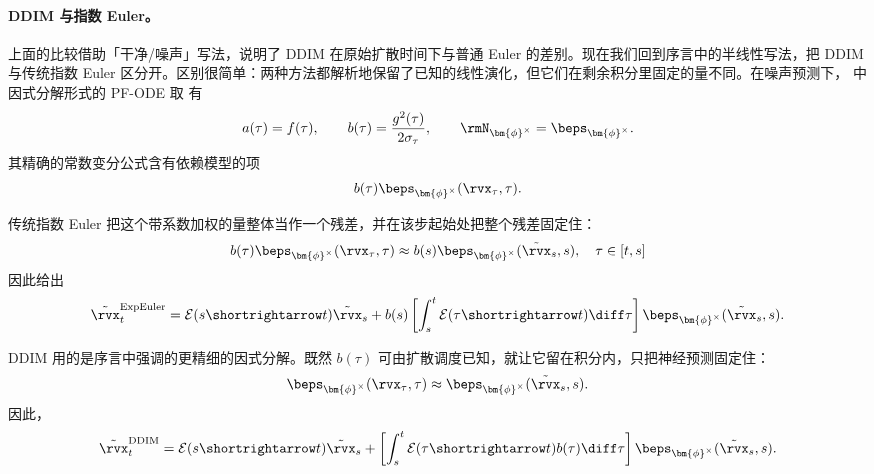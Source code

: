 \paragraph{DDIM 与指数 Euler。}
上面的比较借助「干净/噪声」写法，说明了 DDIM 在原始扩散时间下与普通 Euler 的差别。现在我们回到序言中的半线性写法，把 DDIM 与传统指数 Euler 区分开。区别很简单：两种方法都解析地保留了已知的线性演化，但它们在剩余积分里固定的量不同。在噪声预测下， 中因式分解形式的 PF-ODE 取
 有
\[
a(\tau)=f(\tau),
\qquad
b(\tau)=\frac{g^2(\tau)}{2\sigma_\tau},
\qquad
\rmN_{\bm{\phi}^\times}
=
\beps_{\bm{\phi}^\times}.
\]
其精确的常数变分公式含有依赖模型的项
\[
b(\tau)\beps_{\bm{\phi}^\times}(\rvx_\tau,\tau).
\]

传统指数 Euler 把这个带系数加权的量整体当作一个残差，并在该步起始处把整个残差固定住：
\[
b(\tau)\beps_{\bm{\phi}^\times}(\rvx_\tau,\tau)
\approx
b(s)\beps_{\bm{\phi}^\times}(\tilde\rvx_s,s), \quad\tau\in[t,s]
\]
因此给出
\[
\tilde\rvx_t^{\mathrm{ExpEuler}}
=
\mathcal E(s\shortrightarrow t)\tilde\rvx_s
+
b(s)
\left[
\int_s^t
\mathcal E(\tau\shortrightarrow t)
\diff\tau
\right]
\beps_{\bm{\phi}^\times}(\tilde\rvx_s,s).
\]

DDIM 用的是序言中强调的更精细的因式分解。既然 $b(\tau)$ 可由扩散调度已知，就让它留在积分内，只把神经预测固定住：
\[
\beps_{\bm{\phi}^\times}(\rvx_\tau,\tau)
\approx
\beps_{\bm{\phi}^\times}(\tilde\rvx_s,s).
\]
因此，
\[
\tilde\rvx_t^{\mathrm{DDIM}}
=
\mathcal E(s\shortrightarrow t)\tilde\rvx_s
+
\left[
\int_s^t
\mathcal E(\tau\shortrightarrow t)b(\tau)
\diff\tau
\right]
\beps_{\bm{\phi}^\times}(\tilde\rvx_s,s).
\]

